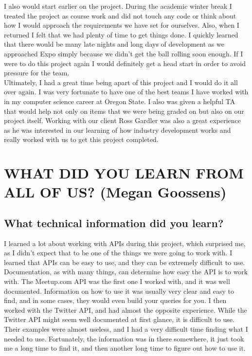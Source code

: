 \documentclass[draftclsnofoot,10pt,onecolumn]{IEEEtran} %
\begin{document}
I also would start earlier on the project. During the academic winter break I
treated the project as course work and did not touch any code or think about how
I would approach the requirements we have set for ourselves. Also, when I
returned I felt that we had plenty of time to get things done. I quickly learned
that there would be many late nights and long days of development as we
approached Expo simply because we didn't get the ball rolling soon enough. If I
were to do this project again I would definitely get a head start in order to
avoid pressure for the team. \\

Ultimately, I had a great time being apart of this project and I would do it all
over again. I was very fortunate to have one of the best teams I have worked
with in my computer science career at Oregon State. I also was given a helpful
TA that would help not only on items that we were being graded on but also on
our project itself. Working with our client Ross Gardler was also a great
experience as he was interested in our learning of how industry development
works and really worked with us to get this project completed.

\section{WHAT DID YOU LEARN FROM ALL OF US? (Megan Goossens)}
\subsection{What technical information did you learn?}
I learned a lot about working with APIs during this project, which surprised me,
as I didn't expect that to be one of the things we were going to work with. I
learned that APIs can be easy to use, and they can be extremely difficult to
use. Documentation, as with many things, can determine how easy the API is to
work with. The Meetup.com API was the first one I worked with, and it was well
documented. Information on how to use it was usually very clear and easy to
find, and in some cases, they would even build your queries for you. I then
worked with the Twitter API, and had almost the opposite experience. While the
Twitter API might seem well documented at first glance, it is difficult to use.
Their examples were almost useless, and I had a very difficult time finding what
I needed to use. Fortunately, the information was in there somewhere, it just
took me a long time to find it, and then another long time to figure out how to
use it.
\end{document}
